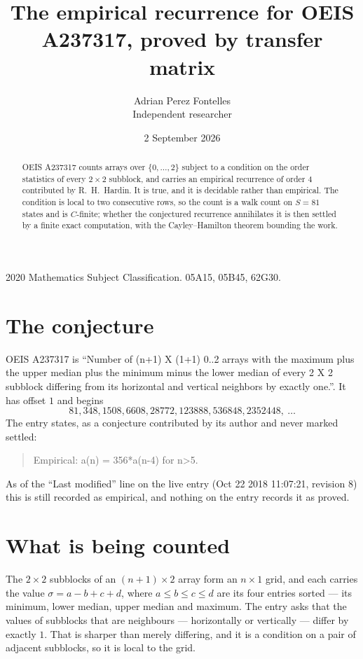 \documentclass[11pt,a4paper]{article}
\title{The empirical recurrence for OEIS A237317, proved by transfer matrix}
\author{Adrian Perez Fontelles\\ \small Independent researcher}
\date{2 September 2026}
\theoremstyle{plain}
\theoremstyle{definition}
\begin{document}
\maketitle

\begin{abstract}
OEIS A237317 counts arrays over $\{0,\dots,2\}$ subject to a condition on the order
statistics of every $2\times2$ subblock, and carries an empirical recurrence of order
$4$ contributed by R.~H.~Hardin. It is true, and it is decidable rather than empirical.
The condition is local to two consecutive rows, so the count is a walk count on $S=81$
states and is $C$-finite; whether the conjectured recurrence annihilates it is then settled by
a finite exact computation, with the Cayley--Hamilton theorem bounding the work.
\end{abstract}

\noindent\small 2020 Mathematics Subject Classification. 05A15, 05B45, 62G30.\normalsize

\section{The conjecture}

OEIS A237317 is ``Number of (n+1) X (1+1) 0..2 arrays with the maximum plus the upper median plus the minimum minus the lower median of every 2 X 2 subblock differing from its horizontal and vertical neighbors by exactly one.''. It has offset $1$ and begins
\[
81, 348, 1508, 6608, 28772, 123888, 536848, 2352448,\ \dots
\]
The entry states, as a conjecture contributed by its author and never marked settled:
\begin{quote}
Empirical: a(n) = 356*a(n-4) for n>5.
\end{quote}
As of the ``Last modified'' line on the live entry (Oct 22 2018 11:07:21, revision 8) this is still
recorded as empirical, and nothing on the entry records it as proved.

\section{What is being counted}

The $2\times2$ subblocks of an $(n+1)\times2$ array form an
$n\times1$ grid, and each carries the value $\sigma=a-b+c+d$, where $a\le b\le c\le d$ are its four entries sorted --- its minimum, lower median, upper median and maximum. The entry asks that the values of
subblocks that are neighbours --- horizontally or vertically --- differ by exactly $1$.
That is sharper than merely differing, and it is a condition on a pair of adjacent subblocks,
so it is local to the grid.
\end{document}
